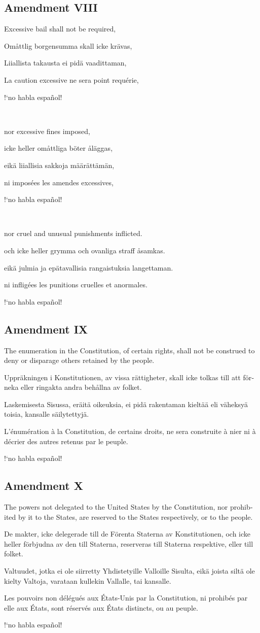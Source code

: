 \documentclass[a4paper,landscape,10pt]{article}
\newcommand{\tblock}[5]{\noindent\begin{minipage}[t]{0.18\textwidth}\foreignlanguage{english}{#1}\end{minipage}\hskip 0.025\textwidth\begin{minipage}[t]{0.18\textwidth}\foreignlanguage{swedish}{#2}\end{minipage}\hskip 0.025\textwidth\begin{minipage}[t]{0.18\textwidth}\foreignlanguage{finnish}{#3}\end{minipage}\hskip 0.025\textwidth\begin{minipage}[t]{0.18\textwidth}\foreignlanguage{french}{#4}\end{minipage}\hskip 0.025\textwidth\begin{minipage}[t]{0.18\textwidth}\foreignlanguage{spanish}{#5}\end{minipage}}
\begin{document}
\subsection*{Amendment VIII}
\tblock
{Excessive bail shall not be required,}
{Omåttlig borgensumma skall icke krävas,}
{Liiallista takausta ei pidä vaadittaman,}
{La caution excessive ne sera point requérie,}
{!`no habla español!}

~

\tblock
{nor excessive fines imposed,}
{icke heller omåttliga böter åläggas,}
{eikä liiallisia sakkoja määrättämän,}
{ni imposées les amendes excessives,}
{!`no habla español!}

~

\tblock
{nor cruel and unusual punishments inflicted.}
{och icke heller grymma och ovanliga straff åsamkas.}
{eikä julmia ja epätavallisia rangaistuksia langettaman.}
{ni infligées les punitions cruelles et anormales.}
{!`no habla español!}

\subsection*{Amendment IX}
\tblock
{The enumeration in the Constitution, of certain rights, shall not be construed to deny or disparage others retained by the people.}
{Uppräkningen i Konstitutionen, av vissa rättigheter, skall icke tolkas till att förneka eller ringakta andra behållna av folket.}
{Laskemisesta Sisussa, eräitä oikeuksia, ei pidä rakentaman kieltää eli väheksyä toisia, kansalle säilytettyjä.}
{L'énumération à la Constitution, de certains droits, ne sera construite à nier ni à décrier des autres retenus par le peuple.}
{!`no habla español!}

\subsection*{Amendment X}
\tblock
{The powers not delegated to the United States by the Constitution, nor prohibited by it to the States, are reserved to the States respectively, or to the people.}
{De makter, icke delegerade till de Förenta Staterna av Konstitutionen, och icke heller förbjudna av den till Staterna, reserveras till Staterna respektive, eller till folket.}
{Valtuudet, jotka ei ole siirretty Yhdistetyille Valloille Sisulta, eikä joista siltä ole kielty Valtoja, varataan kullekin Vallalle, tai kansalle.}
{Les pouvoirs non délégués aux États-Unis par la Constitution, ni prohibés par elle aux États, sont réservés aux États distincts, ou au peuple.}
{!`no habla español!}
\end{document}
